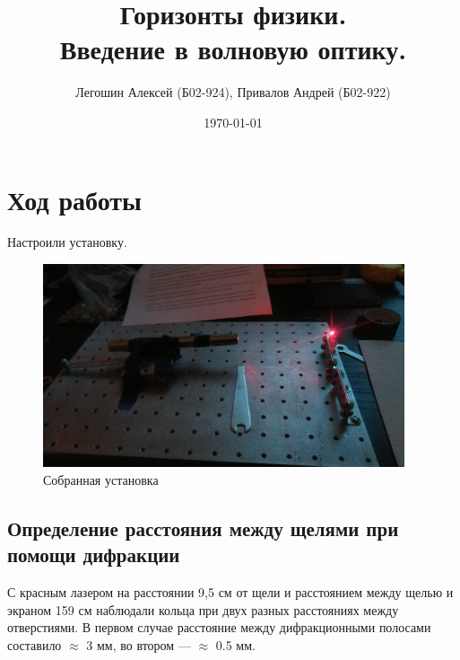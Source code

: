 \documentclass[titlepage, a4paper,12pt]{article}
\author{Легошин Алексей (Б02-924), Привалов Андрей (Б02-922)}
\title{
Горизонты физики. \\
Введение в волновую оптику.
}
\date{\today}
\begin{document}
	\maketitle

	\newpage
	
	\section{Ход работы}
	
	Настроили установку.
	
	\begin{figure}[h!]
		\begin{center}
			\includegraphics[width = 0.95\textwidth]{1}
			\caption{Собранная установка}
			\label{ris:1}
		\end{center}
	\end{figure}
	
	\subsection{Определение расстояния между щелями при помощи дифракции}
	
	С красным лазером на расстоянии 9,5 см от щели и расстоянием между щелью и экраном 159 см наблюдали кольца при двух разных расстояниях между отверстиями. В первом случае расстояние между дифракционными полосами составило $\approx$ 3 мм, во втором --- $\approx$ 0.5 мм.
	
\end{document}
